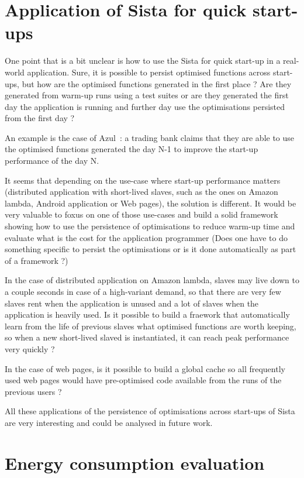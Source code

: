 \documentclass[a4paper,12pt,twoside]{../includes/ThesisStyle}
\begin{document}
\section{Application of Sista for quick start-ups}
\label{sec:useCase}

One point that is a bit unclear is how to use the Sista for quick start-up in a real-world application. Sure, it is possible to persist optimised functions across start-ups, but how are the optimised functions generated in the first place ? Are they generated from warm-up runs using a test suites or are they generated the first day the application is running and further day use the optimisations persisted from the first day ?

An example is the case of Azul~\cite{Azul}: a trading bank claims that they are able to use the optimised functions generated the day N-1 to improve the start-up performance of the day N. 

It seems that depending on the use-case where start-up performance matters (distributed application with short-lived slaves, such as the ones on Amazon lambda, Android application or Web pages), the solution is different. It would be very valuable to foxus on one of those use-cases and build a solid framework showing how to use the persistence of optimisations to reduce warm-up time and evaluate what is the cost for the application programmer (Does one have to do something specific to persist the optimisations or is it done automatically as part of a framework ?)

In the case of distributed application on Amazon lambda, slaves may live down to a couple seconds in case of a high-variant demand, so that there are very few slaves rent when the application is unused and a lot of slaves when the application is heavily used. Is it possible to build a fraework that automatically learn from the life of previous slaves what optimised functions are worth keeping, so when a new short-lived slaved is instantiated, it can reach peak performance very quickly ?

In the case of web pages, is it possible to build a global cache so all frequently used web pages would have pre-optimised code available from the runs of the previous users ?

All these applications of the persistence of optimisations across start-ups of Sista are very interesting and could be analysed in future work.

\section{Energy consumption evaluation}
\label{sec:energy}
\end{document}

